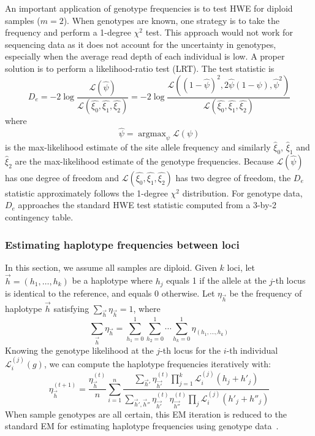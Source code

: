 \documentclass{bioinfo}
\DeclareMathOperator*{\argmax}{argmax}
\begin{document}
\begin{methods}
An important application of genotype frequencies is to test HWE
for diploid samples ($m=2$).  When genotypes are known, one strategy is to
take the frequency and perform a 1-degree $\chi^2$ test. This approach would
not work for sequencing data as it does not account for the uncertainty in
genotypes, especially when the average read depth of each individual is low. A
proper solution is to perform a likelihood-ratio test (LRT). The test statistic is
\begin{equation}\label{eq:hwe}
D_e=-2\log\frac{\mathcal{L}(\hat{\psi})}{\mathcal{L}(\hat{\xi_0},\hat{\xi_1},\hat{\xi_2})}
=-2\log\frac{\mathcal{L}((1-\hat{\psi})^2,2\hat{\psi}(1-\psi),\hat{\psi}^2)}{\mathcal{L}(\hat{\xi_0},\hat{\xi_1},\hat{\xi_2})}
\end{equation}
where
\begin{equation}\label{eq:psimax}
\hat{\psi}=\argmax_{\psi}\mathcal{L}(\psi)
\end{equation}
is the max-likelihood estimate of the site allele frequency and similarly
$\hat{\xi}_0$, $\hat{\xi}_1$ and $\hat{\xi}_2$ are the max-likelihood estimate
of the genotype frequencies. Because $\mathcal{L}(\hat{\psi})$ has one degree of freedom
and $\mathcal{L}(\hat{\xi_0},\hat{\xi_1},\hat{\xi_2})$ has two degree of freedom,
the $D_e$ statistic approximately follows the
1-degree $\chi^2$ distribution. For genotype data, $D_e$ approaches the standard
HWE test statistic computed from a 3-by-2 contingency table.

\subsubsection{Estimating haplotype frequencies between loci}
In this section, we assume all samples are diploid. Given $k$ loci, let
$\vec{h}=(h_1,\ldots,h_k)$ be a haplotype where $h_j$ equals 1 if the allele at
the $j$-th locus is identical to the reference, and equals 0 otherwise.  Let
$\eta_{\vec{h}}$ be the frequency of haplotype $\vec{h}$ satisfying
$\sum_{\vec{h}}\eta_{\vec{h}}=1$, where
$$
\sum_{\vec{h}}\eta_{\vec{h}}=\sum_{h_1=0}^1\sum_{h_2=0}^1\cdots\sum_{h_k=0}^1\eta_{(h_1,\ldots,h_k)}
$$
Knowing the genotype likelihood at the $j$-th locus for the $i$-th individual
$\mathcal{L}^{(j)}_i(g)$, we can compute the haplotype frequencies iteratively
with:
\begin{equation}\label{equ:hf}
\eta^{(t+1)}_{\vec{h}}=\frac{\eta_{\vec{h}}^{(t)}}{n}\sum_{i=1}^n\frac{\sum_{\vec{h}'}\eta_{\vec{h'}}^{(t)}\prod_{j=1}^k\mathcal{L}^{(j)}_i(h_j+h'_j)}
{\sum_{\vec{h}',\vec{h}''}\eta_{\vec{h'}}^{(t)}\eta_{\vec{h''}}^{(t)}\prod_{j}\mathcal{L}^{(j)}_i(h'_j+h''_j)}
\end{equation}
When sample genotypes are all certain, this EM iteration is reduced to the
standard EM for estimating haplotype frequencies using genotype
data~\citep{Excoffier:1995ly}.


\end{methods}
\end{document}
